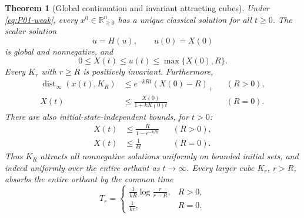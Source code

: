 \documentclass[11pt]{article}
\newcommand{\R}{\mathbb{R}}
\newcommand{\Orth}{\R_{\geq 0}^{n}}
\newtheorem{theorem}{Theorem}[section]
\theoremstyle{definition}
\theoremstyle{remark}
\begin{document}
\begin{theorem}[Global continuation and invariant attracting cubes]
\label{thm:P01-global}
Under \eqref{eq:P01-weak}, every $x^0\in\Orth$ has a unique classical
solution for all $t\ge0$. The scalar solution
\begin{equation}
\label{eq:P01-scalar}
 \dot u=H(u),\qquad u(0)=X(0)
\end{equation}
is global and nonnegative, and
\begin{equation}
\label{eq:P01-globalbound}
 0\le X(t)\le u(t)\le\max\{X(0),R\}.
\end{equation}
Every $K_r$ with $r\ge R$ is positively invariant. Furthermore,
\begin{align}
 \operatorname{dist}_\infty(x(t),K_R)
   &\le e^{-kRt}(X(0)-R)_+ &&(R>0), \label{eq:P01-distance-rate}\\
 X(t)&\le\frac{X(0)}{1+kX(0)t} &&(R=0). \label{eq:P01-zero-rate}
\end{align}
There are also initial-state-independent bounds, for $t>0$:
\begin{align}
 X(t)&\le\frac{R}{1-e^{-kRt}} &&(R>0), \label{eq:P01-comingdown}\\
 X(t)&\le\frac1{kt} &&(R=0). \label{eq:P01-comingdown-zero}
\end{align}
Thus $K_R$ attracts all nonnegative solutions uniformly on bounded
initial sets, and indeed uniformly over the entire orthant as
$t\to\infty$. Every larger cube $K_r$, $r>R$, absorbs the entire
orthant by the common time
\begin{equation}
\label{eq:P01-outer-time}
 T_r=\begin{cases}
 \displaystyle\frac1{kR}\log\frac{r}{r-R},&R>0,\\[4pt]
 \displaystyle\frac1{kr},&R=0.
 \end{cases}
\end{equation}
\end{theorem}
\end{document}
